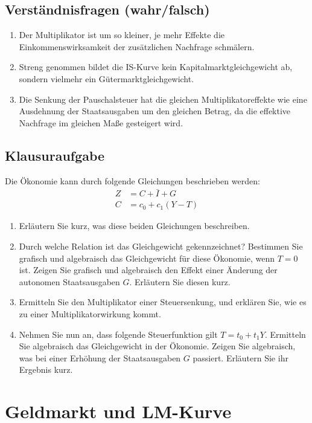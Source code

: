 \documentclass{scrartcl}
\begin{document}
\subsection{Verst\"{a}ndnisfragen (wahr/falsch)}
\begin{enumerate}
  \item Der Multiplikator ist um so kleiner, je mehr Effekte die Einkommenswirksamkeit der zus\"{a}tzlichen Nachfrage schm\"{a}lern. %
  \item Streng genommen bildet die IS-Kurve kein Kapitalmarktgleichgewicht ab, sondern vielmehr ein
      G\"{u}termarktgleichgewicht. %
    \item Die Senkung der Pauschalsteuer hat die gleichen Multiplikatoreffekte wie eine Ausdehnung der Staatsausgaben um
        den gleichen Betrag, da die effektive Nachfrage im gleichen Ma{\ss}e gesteigert wird. %
\end{enumerate}

\subsection{Klausuraufgabe}
Die \"{O}konomie kann durch folgende Gleichungen beschrieben werden:
\begin{align*}
  Z &= C+\bar{I}+G\\
  C &= c_0 + c_1(Y-T)
\end{align*}
\begin{enumerate}
  \item Erl\"{a}utern Sie kurz, was diese beiden Gleichungen beschreiben.
  \item Durch welche Relation ist das Gleichgewicht gekennzeichnet? Bestimmen Sie grafisch und algebraisch das Gleichgewicht f\"{u}r diese \"{O}konomie, wenn $T=0$ ist. Zeigen Sie grafisch und algebraisch den Effekt einer \"{A}nderung der autonomen Staatsausgaben $G$. Erl\"{a}utern Sie diesen kurz.
  \item Ermitteln Sie den Multiplikator einer Steuersenkung, und erklären Sie, wie es zu einer Multiplikatorwirkung kommt.  
  \item Nehmen Sie nun an, dass folgende Steuerfunktion gilt $T=t_0 + t_1 Y$. Ermitteln Sie algebraisch das Gleichgewicht in der \"{O}konomie. Zeigen Sie algebraisch, was bei einer Erh\"{o}hung der Staatsausgaben $G$ passiert. Erl\"{a}utern Sie ihr Ergebnis kurz.
\end{enumerate}

\section{Geldmarkt und LM-Kurve}
\end{document}
